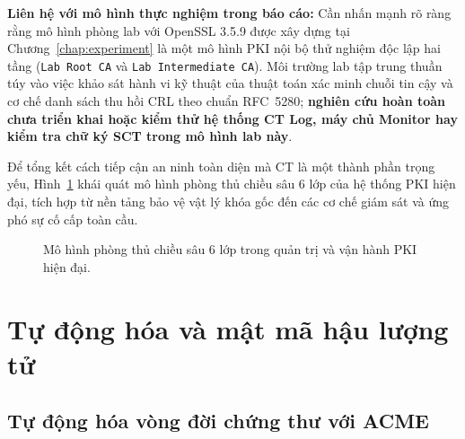 \noindent\textbf{Liên hệ với mô hình thực nghiệm trong báo cáo:} Cần nhấn mạnh rõ ràng rằng mô hình phòng lab với OpenSSL 3.5.9 được xây dựng tại Chương~\ref{chap:experiment} là một mô hình PKI nội bộ thử nghiệm độc lập hai tầng (\texttt{Lab Root CA} và \texttt{Lab Intermediate CA}). Môi trường lab tập trung thuần túy vào việc khảo sát hành vi kỹ thuật của thuật toán xác minh chuỗi tin cậy và cơ chế danh sách thu hồi CRL theo chuẩn RFC~5280; \textbf{nghiên cứu hoàn toàn chưa triển khai hoặc kiểm thử hệ thống CT Log, máy chủ Monitor hay kiểm tra chữ ký SCT trong mô hình lab này}.

Để tổng kết cách tiếp cận an ninh toàn diện mà CT là một thành phần trọng yếu, Hình~\ref{fig:defense-in-depth-pki} khái quát mô hình phòng thủ chiều sâu 6 lớp của hệ thống PKI hiện đại, tích hợp từ nền tảng bảo vệ vật lý khóa gốc đến các cơ chế giám sát và ứng phó sự cố cấp toàn cầu.

\clearpage
\begin{figure}[!htbp]
\centering

\caption{Mô hình phòng thủ chiều sâu 6 lớp trong quản trị và vận hành PKI hiện đại.}
\label{fig:defense-in-depth-pki}
\end{figure}

\section{Tự động hóa và mật mã hậu lượng tử}
\label{sec:tu-dong-hoa-pqc}

\subsection{Tự động hóa vòng đời chứng thư với ACME}
\label{sec:acme-automation}

